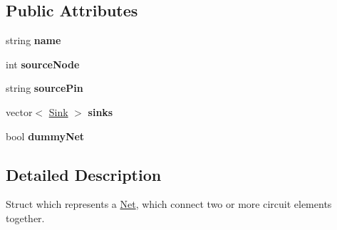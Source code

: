 \subsection*{Public Attributes}
\begin{DoxyCompactItemize}
\item 
\hypertarget{structCircuit__Netlist_1_1Net_aaf85019638c09259b055dc0d1352054a}{string {\bfseries name}}\label{structCircuit__Netlist_1_1Net_aaf85019638c09259b055dc0d1352054a}

\item 
\hypertarget{structCircuit__Netlist_1_1Net_a92ee3950fbcbe247f1d98c180ebb4813}{int {\bfseries source\-Node}}\label{structCircuit__Netlist_1_1Net_a92ee3950fbcbe247f1d98c180ebb4813}

\item 
\hypertarget{structCircuit__Netlist_1_1Net_a44ebd7aa36b2d81b127527a09654f99e}{string {\bfseries source\-Pin}}\label{structCircuit__Netlist_1_1Net_a44ebd7aa36b2d81b127527a09654f99e}

\item 
\hypertarget{structCircuit__Netlist_1_1Net_a99d49ffd915347f780cae8fa9cbbd841}{vector$<$ \hyperlink{structCircuit__Netlist_1_1Sink}{Sink} $>$ {\bfseries sinks}}\label{structCircuit__Netlist_1_1Net_a99d49ffd915347f780cae8fa9cbbd841}

\item 
\hypertarget{structCircuit__Netlist_1_1Net_aad21a10a91330fd07d89ffccf21b55f8}{bool {\bfseries dummy\-Net}}\label{structCircuit__Netlist_1_1Net_aad21a10a91330fd07d89ffccf21b55f8}

\end{DoxyCompactItemize}


\subsection{Detailed Description}
Struct which represents a \hyperlink{structCircuit__Netlist_1_1Net}{Net}, which connect two or more circuit elements together. 




